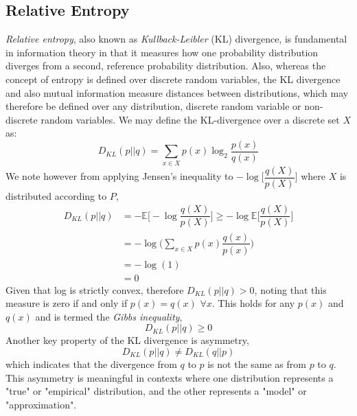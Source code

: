 \documentclass[12pt]{article}
\begin{document}
		\subsection{Relative Entropy}
		\emph{Relative entropy}, also known as \emph{Kullback-Leibler} (KL) divergence, is fundamental  in information theory in that it measures how one probability distribution diverges from a second, reference probability distribution. Also, whereas the concept of entropy is defined over discrete random variables, the KL divergence and also mutual information measure distances between distributions, which may therefore be defined over any distribution, discrete random variable or non-discrete random variables. We may define the KL-divergence over a discrete set \(X\) as:
		\[ D_{KL}(p||q) = \sum_{x \in X} p(x) \log_2 \frac{p(x)}{q(x)} \]
		We note however from applying Jensen's inequality to $-\log\Biggr[\dfrac{q(X)}{p(X)} \Biggl]$ where $X$ is distributed according to $P$, 
		\begin{align}
			D_{KL}(p||q) & = - \mathbb{E} \Biggr[-\log\dfrac{q(X)}{p(X)} \Biggl] \geq -\log  \mathbb{E}  \Biggr[\dfrac{q(X)}{p(X)} \Biggl] \\
			& = - \log \Biggr(  \sum_{x \in X}  p(x) \dfrac{q(x)}{p(x)}\Biggl) \\
			& = - \log(1) \\
			& = 0
		\end{align}
		Given that log is strictly convex, therefore  $D_{KL}(p||q) > 0$, noting that this measure is  zero if and only if \(p(x) = q(x)\) \( \forall x\). This holds for any $p(x)$ and $q(x)$ and is termed the \emph{Gibbs inequality}, 
		\[ D_{KL}(p||q) \geq 0 \]
		Another key property of the KL divergence is  asymmetry, 
		\begin{equation}
			D_{KL}(p||q) \neq D_{KL}(q||p)
		\end{equation}
		which indicates that the divergence from \(q\) to \(p\) is not the same as from \(p\) to \(q\). This asymmetry is meaningful in contexts where one distribution represents a "true" or "empirical" distribution, and the other represents a "model" or "approximation". 
		
\end{document}
